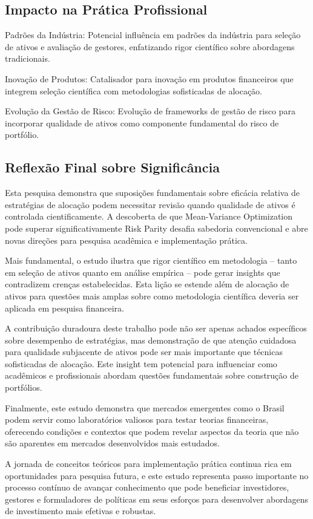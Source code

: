 \subsection{Impacto na Prática Profissional}

Padrões da Indústria: Potencial influência em padrões da indústria para seleção de ativos e avaliação de gestores, enfatizando rigor científico sobre abordagens tradicionais.

Inovação de Produtos: Catalisador para inovação em produtos financeiros que integrem seleção científica com metodologias sofisticadas de alocação.

Evolução da Gestão de Risco: Evolução de frameworks de gestão de risco para incorporar qualidade de ativos como componente fundamental do risco de portfólio.

\subsection{Reflexão Final sobre Significância}

Esta pesquisa demonstra que suposições fundamentais sobre eficácia relativa de estratégias de alocação podem necessitar revisão quando qualidade de ativos é controlada cientificamente. A descoberta de que Mean-Variance Optimization pode superar significativamente Risk Parity desafia sabedoria convencional e abre novas direções para pesquisa acadêmica e implementação prática.

Mais fundamental, o estudo ilustra que rigor científico em metodologia – tanto em seleção de ativos quanto em análise empírica – pode gerar insights que contradizem crenças estabelecidas. Esta lição se estende além de alocação de ativos para questões mais amplas sobre como metodologia científica deveria ser aplicada em pesquisa financeira.

A contribuição duradoura deste trabalho pode não ser apenas achados específicos sobre desempenho de estratégias, mas demonstração de que atenção cuidadosa para qualidade subjacente de ativos pode ser mais importante que técnicas sofisticadas de alocação. Este insight tem potencial para influenciar como acadêmicos e profissionais abordam questões fundamentais sobre construção de portfólios.

Finalmente, este estudo demonstra que mercados emergentes como o Brasil podem servir como laboratórios valiosos para testar teorias financeiras, oferecendo condições e contextos que podem revelar aspectos da teoria que não são aparentes em mercados desenvolvidos mais estudados.

A jornada de conceitos teóricos para implementação prática continua rica em oportunidades para pesquisa futura, e este estudo representa passo importante no processo contínuo de avançar conhecimento que pode beneficiar investidores, gestores e formuladores de políticas em seus esforços para desenvolver abordagens de investimento mais efetivas e robustas.